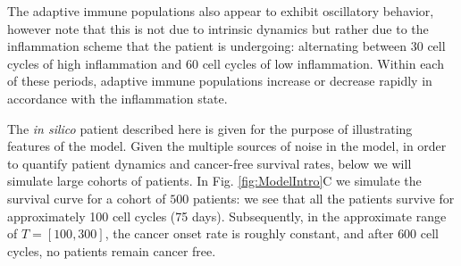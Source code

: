 \documentclass[11pt]{article}
\begin{document}
The adaptive immune populations also appear to exhibit oscillatory behavior, however note that this is not due to intrinsic dynamics but rather due to the inflammation scheme that the patient is undergoing: alternating between 30 cell cycles of high inflammation and 60 cell cycles of low inflammation. Within each of these periods, adaptive immune populations increase or decrease rapidly in accordance with the inflammation state.
\par 
The {\em in silico} patient described here is given for the purpose of illustrating features of the model. Given the multiple sources of noise in the model, in order to quantify patient dynamics and cancer-free survival rates, below we will simulate large cohorts of patients. In Fig. \ref{fig:ModelIntro}C we simulate the survival curve for a cohort of $500$ patients: we see that all the patients survive for approximately 100 cell cycles (75 days). Subsequently, in the approximate range of $T= [100,300]$, the cancer onset rate is roughly constant, and after $600$ cell cycles, no patients remain cancer free.
\end{document}
